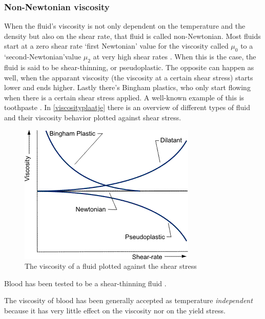 \subsubsection{Non-Newtonian viscosity}
When the fluid's viscosity is not only dependent on the temperature and the density but also on the shear rate, that fluid is called non-Newtonian. Most fluids start at a zero shear rate `first Newtonian' value for the viscosity called $\mu_{0}$ to a `second-Newtonian'value $\mu_{2}$ at very high shear rates \cite{nonnewtsimulation}. When this is the case, the fluid is said to be shear-thinning, or pseudoplastic. The opposite can happen as well, when the apparant viscosity (the viscosity at a certain shear stress) starts lower and ends higher. Lastly there's Bingham plastics, who only start flowing when there is a certain shear stress applied. A well-known example of this is toothpaste \cite{FT}. In \autoref{viscosityplaatje} there is an overview of different types of fluid and their viscosity behavior plotted against shear stress.
\begin{figure}[hb]
\centering
\includegraphics{viscosityshearstress.png}
\caption{The viscosity of a fluid plotted against the shear stress \cite{viscositypicture}}
\label{viscosityplaatje}
\end{figure}
Blood has been tested to be a shear-thinning fluid \cite{bloodthinning}. 
 
The viscosity of blood has been generally accepted as temperature \emph{independent} because it has very little effect on the viscosity nor on the yield stress\cite{rheologyofblood}.


